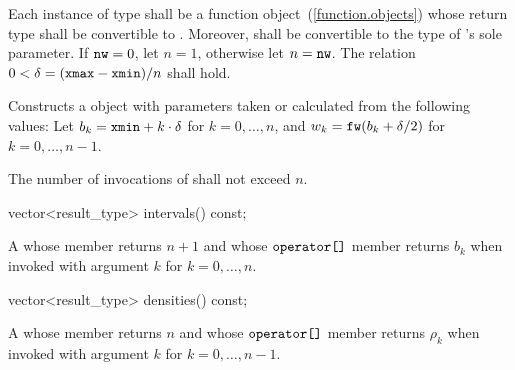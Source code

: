 \begin{itemdescr}
\pnum\requires
 Each instance of type 
 shall be a function object~(\ref{function.objects})
 whose return type shall be convertible to .
 Moreover,
  shall be convertible
 to the type of 's sole parameter.
 If $ \texttt{nw} = 0 $, let $ n = 1 $, otherwise let $n = \texttt{nw}$.
 The relation $ 0 < \delta = (\texttt{xmax} - \texttt{xmin}) / n $
 shall hold.

\pnum\effects Constructs a  object
 with parameters taken or calculated
 from the following values:
 Let $ b_k = \texttt{xmin} + k \cdot \delta $ for $ k = 0, \ldots, n $,
 and $ w_k = \texttt{fw}(b_k + \delta / 2) $ for $ k = 0, \ldots, n\!-\!1 $.

\pnum\complexity
 The number of invocations of  shall not exceed $n$.
\end{itemdescr}

%
%
\begin{itemdecl}
vector<result_type> intervals() const;
\end{itemdecl}

\begin{itemdescr}
\pnum\returns A 
 whose  member returns $n + 1$
 and whose $ \texttt{operator[]} $ member returns $b_k$
 when invoked with argument $k$ for $k = 0, \ldots, n $.
\end{itemdescr}

%
%
\begin{itemdecl}
vector<result_type> densities() const;
\end{itemdecl}

\begin{itemdescr}
\pnum\returns A 
 whose  member returns $n$
 and whose $ \texttt{operator[]} $ member returns $\rho_k$
 when invoked with argument $k$ for $k = 0, \ldots, n\!-\!1 $.
\end{itemdescr}



